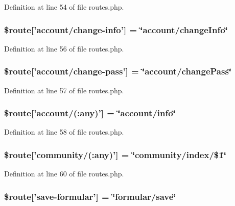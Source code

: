 Definition at line 54 of file routes.\-php.

\subsubsection[{\$route}]{\setlength{\rightskip}{0pt plus 5cm}\$route['account/change-\/info'] = \char`\"{}account/change\-Info\char`\"{}}\label{routes_8php_a456226c2c4c89e963ae1f7a39c05f664}


Definition at line 56 of file routes.\-php.

\subsubsection[{\$route}]{\setlength{\rightskip}{0pt plus 5cm}\$route['account/change-\/pass'] = \char`\"{}account/change\-Pass\char`\"{}}\label{routes_8php_a1f1cca6f261ccaa1eeae697a8e61b43f}


Definition at line 57 of file routes.\-php.

\subsubsection[{\$route}]{\setlength{\rightskip}{0pt plus 5cm}\$route['account/(\-:any)'] = \char`\"{}account/info\char`\"{}}\label{routes_8php_ab69c72ae7bdfb0b07485edc5eab66e93}


Definition at line 58 of file routes.\-php.

\subsubsection[{\$route}]{\setlength{\rightskip}{0pt plus 5cm}\$route['community/(\-:any)'] = \char`\"{}community/index/\$1\char`\"{}}\label{routes_8php_aa42a2acd00cabe0c949ace0144b32d17}


Definition at line 60 of file routes.\-php.

\subsubsection[{\$route}]{\setlength{\rightskip}{0pt plus 5cm}\$route['save-\/formular'] = \char`\"{}formular/save\char`\"{}}\label{routes_8php_abd97a091a6cf337746c8b06f9a74cfd1}



